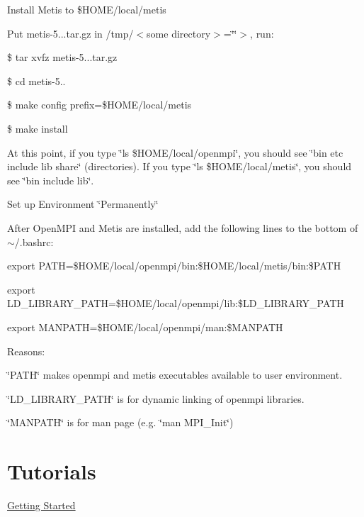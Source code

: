 \begin{DoxyItemize}
Install Metis to \$\+H\+O\+M\+E/local/metis

Put metis-\/5...\+tar.\+gz in /tmp/$<$some directory$>$=\char`\"{}\char`\"{}$>$, run\+:

\$ tar xvfz metis-\/5...\+tar.\+gz

\$ cd metis-\/5..

\$ make config prefix=\$\+H\+O\+M\+E/local/metis

\$ make install
\item At this point, if you type \char`\"{}ls \$\+H\+O\+M\+E/local/openmpi\char`\"{}, you should see \char`\"{}bin etc include lib share\char`\"{} (directories). If you type \char`\"{}ls \$\+H\+O\+M\+E/local/metis\char`\"{}, you should see \char`\"{}bin include lib\char`\"{}.
\item Set up Environment \char`\"{}\+Permanently\char`\"{}

After Open\+M\+P\+I and Metis are installed, add the following lines to the bottom of $\sim$/.bashrc\+:

export P\+A\+T\+H=\$\+H\+O\+M\+E/local/openmpi/bin\+:\$\+H\+O\+M\+E/local/metis/bin\+:\$\+P\+A\+T\+H

export L\+D\+\_\+\+L\+I\+B\+R\+A\+R\+Y\+\_\+\+P\+A\+T\+H=\$\+H\+O\+M\+E/local/openmpi/lib\+:\$\+L\+D\+\_\+\+L\+I\+B\+R\+A\+R\+Y\+\_\+\+P\+A\+T\+H

export M\+A\+N\+P\+A\+T\+H=\$\+H\+O\+M\+E/local/openmpi/man\+:\$\+M\+A\+N\+P\+A\+T\+H

Reasons\+:

\char`\"{}\+P\+A\+T\+H\char`\"{} makes openmpi and metis\textquotesingle{} executables available to user environment.

\char`\"{}\+L\+D\+\_\+\+L\+I\+B\+R\+A\+R\+Y\+\_\+\+P\+A\+T\+H\char`\"{} is for dynamic linking of openmpi libraries.

\char`\"{}\+M\+A\+N\+P\+A\+T\+H\char`\"{} is for man page (e.\+g. \char`\"{}man M\+P\+I\+\_\+\+Init\char`\"{})
\end{DoxyItemize}\hypertarget{_p_i_l_Tutorials}{}\section{Tutorials}\label{_p_i_l_Tutorials}
\hyperlink{_p_i_chargedparticles}{Getting Started} 